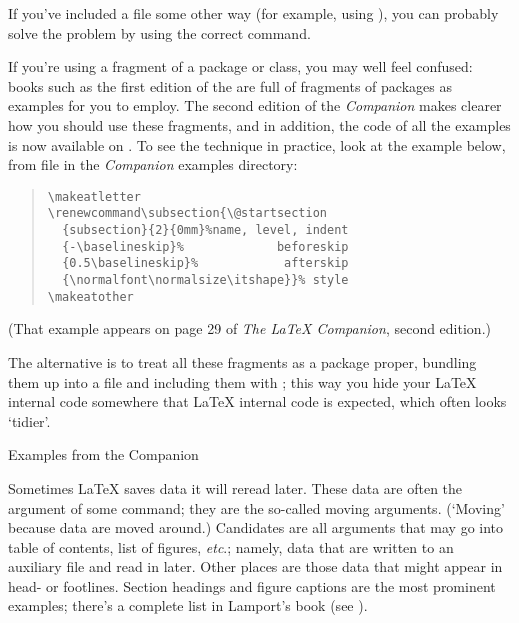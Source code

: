 If you've included a file some other way (for example, using
), you can probably solve the problem by using the correct
command.

If you're using a fragment of a package or class, you may well feel
confused: books such as the first edition of the %
are full of fragments of packages as examples for you to employ.
The second edition of the \emph{Companion} makes clearer how you
should use these fragments, and in addition, the code of
all the examples is now available on .
To see the technique in practice, look at the example below, from file
 in the \emph{Companion} examples directory:
\begin{quote}
\begin{verbatim}
\makeatletter
\renewcommand\subsection{\@startsection
  {subsection}{2}{0mm}%name, level, indent
  {-\baselineskip}%             beforeskip
  {0.5\baselineskip}%            afterskip
  {\normalfont\normalsize\itshape}}% style
\makeatother
\end{verbatim}
\end{quote}
(That example appears on page 29 of \emph{The \LaTeX{} Companion},
second edition.)

The alternative is to treat all these fragments as a package proper,
bundling them up into a  file and including them with
; this way you hide your \LaTeX{} internal code somewhere
that \LaTeX{} internal code is expected, which often looks `tidier'.
\begin{ctanrefs}
\item[\nothtml{\rmfamily}Examples from the Companion]
\end{ctanrefs}


Sometimes \LaTeX{} saves data it will reread later. These data are
often the argument of some command; they are the so-called moving
arguments.  (`Moving' because data are moved around.)  Candidates
are all arguments that may go into table of contents, list of figures,
\emph{etc}.; namely, data that are written to an auxiliary file and
read in later.  Other places are those data that might appear in head-
or footlines.  Section headings and figure captions are the most
prominent examples; there's a complete list in Lamport's book
(see ).

